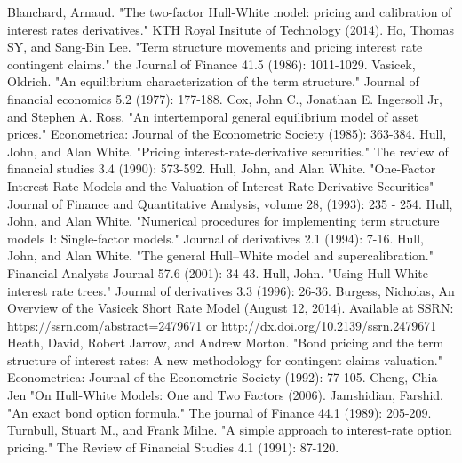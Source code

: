 \documentclass{article}
\begin{document}
\begin{thebibliography}{MMMMM} 
 Blanchard, Arnaud. "The two-factor Hull-White model: pricing and calibration of interest rates derivatives." KTH Royal Insitute of Technology (2014).
 Ho, Thomas SY, and Sang‐Bin Lee. "Term structure movements and pricing interest rate contingent claims." the Journal of Finance 41.5 (1986): 1011-1029.
 Vasicek, Oldrich. "An equilibrium characterization of the term structure." Journal of financial economics 5.2 (1977): 177-188.
 Cox, John C., Jonathan E. Ingersoll Jr, and Stephen A. Ross. "An intertemporal general equilibrium model of asset prices." Econometrica: Journal of the Econometric Society (1985): 363-384.
 Hull, John, and Alan White. "Pricing interest-rate-derivative securities." The review of financial studies 3.4 (1990): 573-592.
 Hull, John, and Alan White. "One-Factor Interest Rate Models and the Valuation of Interest Rate Derivative Securities" Journal of Finance and Quantitative Analysis, volume 28,  (1993): 235 - 254.
 Hull, John, and Alan White. "Numerical procedures for implementing term structure models I: Single-factor models." Journal of derivatives 2.1 (1994): 7-16.
 Hull, John, and Alan White. "The general Hull–White model and supercalibration." Financial Analysts Journal 57.6 (2001): 34-43.
 Hull, John. "Using Hull-White interest rate trees." Journal of derivatives 3.3 (1996): 26-36.
 Burgess, Nicholas, An Overview of the Vasicek Short Rate Model (August 12, 2014). Available at SSRN: https://ssrn.com/abstract=2479671 or http://dx.doi.org/10.2139/ssrn.2479671
 Heath, David, Robert Jarrow, and Andrew Morton. "Bond pricing and the term structure of interest rates: A new methodology for contingent claims valuation." Econometrica: Journal of the Econometric Society (1992): 77-105.
 Cheng, Chia-Jen "On Hull-White Models: One and Two Factors (2006).
 Jamshidian, Farshid. "An exact bond option formula." The journal of Finance 44.1 (1989): 205-209.
  Turnbull, Stuart M., and Frank Milne. "A simple approach to interest-rate option pricing." The Review of Financial Studies 4.1 (1991): 87-120.

\end{thebibliography}


\end{document}
